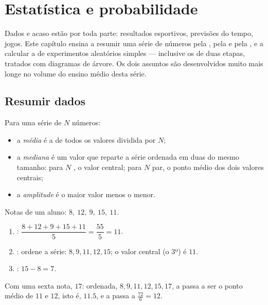 \chapter{Estatística e probabilidade}\label{ch:g9:statproba}

Dados e acaso estão por toda parte: resultados esportivos, previsões do
tempo, jogos. Este capítulo ensina a resumir uma série de números pela
, pela  e pela , e a calcular a  de
experimentos aleatórios simples --- inclusive os de duas etapas,
tratados com diagramas de árvore. Os dois assuntos são desenvolvidos
muito mais longe no volume do ensino médio desta série.

\section{Resumir dados}

\begin{definition}\label{def:g9:statproba:indicators}
Para uma série de $N$ números:
\begin{itemize}
  \item a \emph{média} é a  de todos os valores
        dividida por $N$;
  \item a \emph{mediana} é um valor que reparte a série
        ordenada em duas  do mesmo tamanho: para $N$ , o
        valor central; para $N$ par, o ponto médio dos dois valores
        centrais;
  \item a \emph{amplitude} é o maior valor menos o
        menor.
\end{itemize}
\end{definition}

\begin{example}\label{ex:g9:statproba:indicators}
Notas de um aluno: $8,\ 12,\ 9,\ 15,\ 11$.
\begin{enumerate}
  \item {}: $\dfrac{8 + 12 + 9 + 15 + 11}{5} = \dfrac{55}{5} = 11$.
  \item {}: ordene a série: $8, 9, 11, 12, 15$; o valor central (o
        3º) é $11$.
  \item {}: $15 - 8 = 7$.
\end{enumerate}
Com uma sexta nota, $17$: ordenada, $8, 9, 11, 12, 15, 17$, a 
passa a ser o ponto médio de $11$ e $12$, isto é, $11.5$, e a 
passa a $\frac{72}{6} = 12$.
\end{example}

